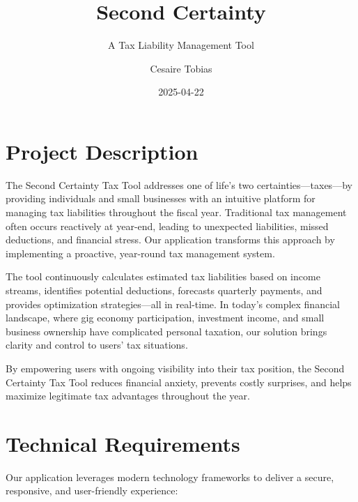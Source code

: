 \documentclass[
  11pt,
  letterpaper,
]{article}
\title{Second Certainty}
\subtitle{A Tax Liability Management Tool}
\author{Cesaire Tobias}
\date{2025-04-22}
\renewcommand*\contentsname{Table of contents}
\newcommand\contentsname{Table of contents}
\begin{document}
\maketitle
\ifdefined\Shaded\renewenvironment{Shaded}{\begin{tcolorbox}[enhanced, borderline west={3pt}{0pt}{shadecolor}, frame hidden, sharp corners, interior hidden, breakable, boxrule=0pt]}{\end{tcolorbox}}\fi

\renewcommand*\contentsname{Table of contents}
{
\hypersetup{linkcolor=}
\setcounter{tocdepth}{3}
\tableofcontents
}
\hypertarget{project-description}{%
\section{Project Description}\label{project-description}}

The Second Certainty Tax Tool addresses one of life's two
certainties---taxes---by providing individuals and small businesses with
an intuitive platform for managing tax liabilities throughout the fiscal
year. Traditional tax management often occurs reactively at year-end,
leading to unexpected liabilities, missed deductions, and financial
stress. Our application transforms this approach by implementing a
proactive, year-round tax management system.

The tool continuously calculates estimated tax liabilities based on
income streams, identifies potential deductions, forecasts quarterly
payments, and provides optimization strategies---all in real-time. In
today's complex financial landscape, where gig economy participation,
investment income, and small business ownership have complicated
personal taxation, our solution brings clarity and control to users' tax
situations.

By empowering users with ongoing visibility into their tax position, the
Second Certainty Tax Tool reduces financial anxiety, prevents costly
surprises, and helps maximize legitimate tax advantages throughout the
year.

\hypertarget{technical-requirements}{%
\section{Technical Requirements}\label{technical-requirements}}

Our application leverages modern technology frameworks to deliver a
secure, responsive, and user-friendly experience:
\end{document}
